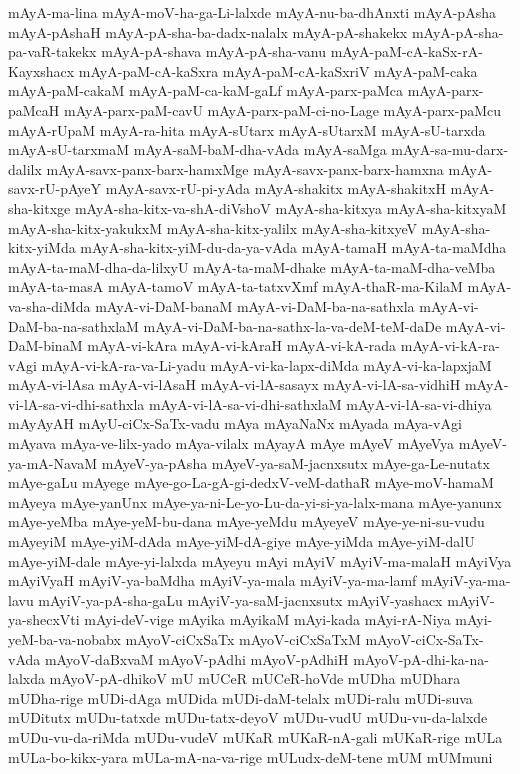 {mAyA-ma-lina
mAyA-moV-ha-ga-Li-lalxde
mAyA-nu-ba-dhAnxti
mAyA-pAsha
mAyA-pAshaH
mAyA-pA-sha-ba-dadx-nalalx
mAyA-pA-shakekx
mAyA-pA-sha-pa-vaR-takekx
mAyA-pA-shava
mAyA-pA-sha-vanu
mAyA-paM-cA-kaSx-rA-Kayxshacx
mAyA-paM-cA-kaSxra
mAyA-paM-cA-kaSxriV
mAyA-paM-caka
mAyA-paM-cakaM
mAyA-paM-ca-kaM-gaLf
mAyA-parx-paMca
mAyA-parx-paMcaH
mAyA-parx-paM-cavU
mAyA-parx-paM-ci-no-Lage
mAyA-parx-paMcu
mAyA-rUpaM
mAyA-ra-hita
mAyA-sUtarx
mAyA-sUtarxM
mAyA-sU-tarxda
mAyA-sU-tarxmaM
mAyA-saM-baM-dha-vAda
mAyA-saMga
mAyA-sa-mu-darx-dalilx
mAyA-savx-panx-barx-hamxMge
mAyA-savx-panx-barx-hamxna
mAyA-savx-rU-pAyeY
mAyA-savx-rU-pi-yAda
mAyA-shakitx
mAyA-shakitxH
mAyA-sha-kitxge
mAyA-sha-kitx-va-shA-diVshoV
mAyA-sha-kitxya
mAyA-sha-kitxyaM
mAyA-sha-kitx-yakukxM
mAyA-sha-kitx-yalilx
mAyA-sha-kitxyeV
mAyA-sha-kitx-yiMda
mAyA-sha-kitx-yiM-du-da-ya-vAda
mAyA-tamaH
mAyA-ta-maMdha
mAyA-ta-maM-dha-da-lilxyU
mAyA-ta-maM-dhake
mAyA-ta-maM-dha-veMba
mAyA-ta-masA
mAyA-tamoV
mAyA-ta-tatxvXmf
mAyA-thaR-ma-KilaM
mAyA-va-sha-diMda
mAyA-vi-DaM-banaM
mAyA-vi-DaM-ba-na-sathxla
mAyA-vi-DaM-ba-na-sathxlaM
mAyA-vi-DaM-ba-na-sathx-la-va-deM-teM-daDe
mAyA-vi-DaM-binaM
mAyA-vi-kAra
mAyA-vi-kAraH
mAyA-vi-kA-rada
mAyA-vi-kA-ra-vAgi
mAyA-vi-kA-ra-va-Li-yadu
mAyA-vi-ka-lapx-diMda
mAyA-vi-ka-lapxjaM
mAyA-vi-lAsa
mAyA-vi-lAsaH
mAyA-vi-lA-sasayx
mAyA-vi-lA-sa-vidhiH
mAyA-vi-lA-sa-vi-dhi-sathxla
mAyA-vi-lA-sa-vi-dhi-sathxlaM
mAyA-vi-lA-sa-vi-dhiya
mAyAyAH
mAyU-ciCx-SaTx-vadu
mAya
mAyaNaNx
mAyada
mAya-vAgi
mAyava
mAya-ve-lilx-yado
mAya-vilalx
mAyayA
mAye
mAyeV
mAyeVya
mAyeV-ya-mA-NavaM
mAyeV-ya-pAsha
mAyeV-ya-saM-jacnxsutx
mAye-ga-Le-nutatx
mAye-gaLu
mAyege
mAye-go-La-gA-gi-dedxV-veM-dathaR
mAye-moV-hamaM
mAyeya
mAye-yanUnx
mAye-ya-ni-Le-yo-Lu-da-yi-si-ya-lalx-mana
mAye-yanunx
mAye-yeMba
mAye-yeM-bu-dana
mAye-yeMdu
mAyeyeV
mAye-ye-ni-su-vudu
mAyeyiM
mAye-yiM-dAda
mAye-yiM-dA-giye
mAye-yiMda
mAye-yiM-dalU
mAye-yiM-dale
mAye-yi-lalxda
mAyeyu
mAyi
mAyiV
mAyiV-ma-malaH
mAyiVya
mAyiVyaH
mAyiV-ya-baMdha
mAyiV-ya-mala
mAyiV-ya-ma-lamf
mAyiV-ya-ma-lavu
mAyiV-ya-pA-sha-gaLu
mAyiV-ya-saM-jacnxsutx
mAyiV-yashacx
mAyiV-ya-shecxVti
mAyi-deV-vige
mAyika
mAyikaM
mAyi-kada
mAyi-rA-Niya
mAyi-yeM-ba-va-nobabx
mAyoV-ciCxSaTx
mAyoV-ciCxSaTxM
mAyoV-ciCx-SaTx-vAda
mAyoV-daBxvaM
mAyoV-pAdhi
mAyoV-pAdhiH
mAyoV-pA-dhi-ka-na-lalxda
mAyoV-pA-dhikoV
mU
mUCeR
mUCeR-hoVde
mUDha
mUDhara
mUDha-rige
mUDi-dAga
mUDida
mUDi-daM-telalx
mUDi-ralu
mUDi-suva
mUDitutx
mUDu-tatxde
mUDu-tatx-deyoV
mUDu-vudU
mUDu-vu-da-lalxde
mUDu-vu-da-riMda
mUDu-vudeV
mUKaR
mUKaR-nA-gali
mUKaR-rige
mULa
mULa-bo-kikx-yara
mULa-mA-na-va-rige
mULudx-deM-tene
mUM
mUMmuni
}
